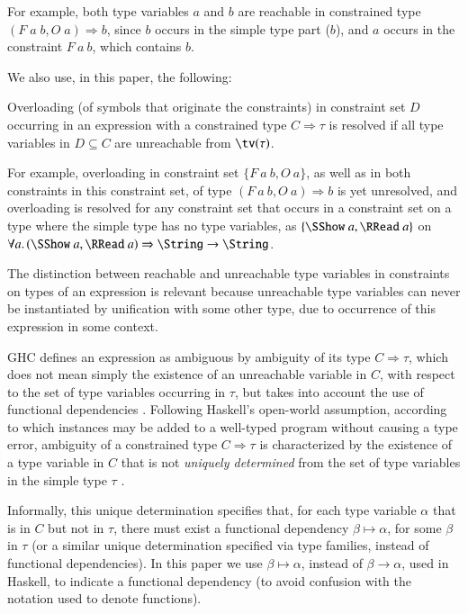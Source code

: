 \documentclass[review]{elsarticle}
\begin{document}
For example, both type variables $a$ and $b$ are reachable in
constrained type $(F\;a\;b,O\; a)\Rightarrow b$, since $b$ occurs in
the simple type part ($b$), and $a$ occurs in the constraint
$F\:a\:b$, which contains $b$.


We also use, in this paper, the following:

\begin{Definition}

Overloading (of symbols that originate the constraints) in constraint
set $D$ occurring in an expression with a constrained type $C
\Rightarrow \tau$ is resolved if all type variables in $D\subseteq C$
are unreachable from $\tv(\tau)$.

\label{overloading-resolution}
\end{Definition}

For example, overloading in constraint set $\{ F\:a\:b,O\: a\}$, as
well as in both constraints in this constraint set, of type
$(F\:a\:b,O\: a) \Rightarrow b$ is yet unresolved, and overloading is
resolved for any constraint set that occurs in a constraint set on a
type where the simple type has no type variables, as $\{\SShow\ a,
\RRead\ a\}$ on $\forall a.\,(\SShow\ a, \RRead\ a)\Rightarrow \String
\rightarrow \String$.

The distinction between reachable and unreachable type variables in
constraints on types of an expression is relevant because unreachable
type variables can never be instantiated by unification with some
other type, due to occurrence of this expression in some context.

GHC defines an expression as ambiguous by ambiguity of its type
$C\Rightarrow \tau$, which does not mean simply the existence of an
unreachable variable in $C$, with respect to the set of type variables
occurring in $\tau$, but takes into account the use of functional
dependencies
\cite{Type-classes-with-FDs-MarkJones00,Ti-for-FDs04,MarkJonesIatchki2008-FDs}. Following
Haskell's open-world assumption, according to which instances may be
added to a well-typed program without causing a type error, ambiguity
of a constrained type $C\Rightarrow \tau$ is characterized by the
existence of a type variable in $C$ that is not {\em uniquely
  determined\/} from the set of type variables in the simple type
$\tau$ \cite{TheoryOfOverloading}.

Informally, this unique determination specifies that, for each type
variable $\alpha$ that is in $C$ but not in $\tau$, there must exist a
functional dependency $\beta \mapsto \alpha$, for some $\beta$ in
$\tau$ (or a similar unique determination specified via type families,
instead of functional dependencies). In this paper we use $\beta
\mapsto \alpha$, instead of $\beta \rightarrow \alpha$, used in
Haskell, to indicate a functional dependency (to avoid confusion with
the notation used to denote functions).
\end{document}
